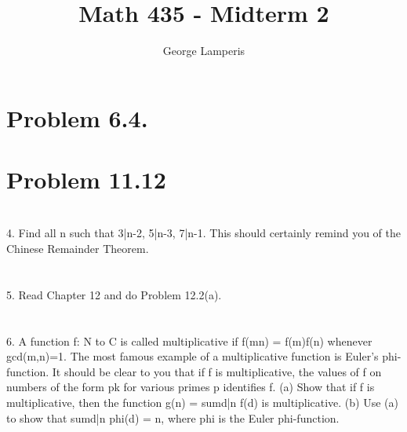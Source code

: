 \documentclass[letterpaper, 12pt, oneside]{memoir}
\title{Math 435 - Midterm 2}
\author{George Lamperis}
\date{}
\theoremstyle{mystyle}
\begin{document}
\maketitle


\section{Problem 6.4.}


\section{} 


\section{Problem 11.12} 


\section{} 
4. Find all n such that  3|n-2, 5|n-3, 7|n-1. This should certainly remind you of the Chinese Remainder Theorem. 
\section{} 
5. Read Chapter 12 and do Problem 12.2(a). 
\section{} 
6. A function f: N to C is called multiplicative if f(mn) = f(m)f(n) whenever gcd(m,n)=1. The most famous example of a multiplicative function is Euler's phi-function. It should be clear to you that if f is multiplicative, the values of f on numbers of the form pk for various primes p identifies f. 
(a) Show that if f is multiplicative, then the function g(n) = sumd|n f(d) is multiplicative. 
(b) Use (a) to show that sumd|n phi(d) = n, where phi is the Euler phi-function. 
\end{document}
